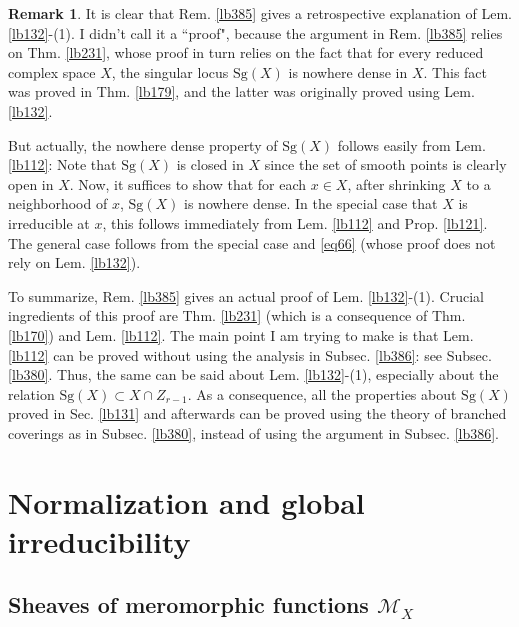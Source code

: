 \documentclass[12pt,b5paper,notitlepage]{report}
\theoremstyle{definition}
\newtheorem{rem}[df]{Remark}
\theoremstyle{plain}
\newcommand{\scr}{\mathscr}
\newcommand{\Sg}{\mathrm{Sg}}
\numberwithin{equation}{section}
\begin{document}
\begin{rem}
It is clear that Rem. \ref{lb385} gives a retrospective explanation of Lem. \ref{lb132}-(1). I didn't call it a ``proof", because the argument in Rem. \ref{lb385} relies on Thm. \ref{lb231}, whose proof in turn relies on the fact that for every reduced complex space $X$, the singular locus $\Sg(X)$ is nowhere dense in $X$. This fact was proved in Thm. \ref{lb179}, and the latter was originally proved using Lem. \ref{lb132}.

But actually, the nowhere dense property of $\Sg(X)$ follows easily from Lem. \ref{lb112}: Note that $\Sg(X)$ is closed in $X$ since the set of smooth points is clearly open in $X$. Now, it suffices to show that for each $x\in X$, after shrinking $X$ to a neighborhood of $x$, $\Sg(X)$ is nowhere dense. In the special case that $X$ is irreducible at $x$, this follows immediately from Lem. \ref{lb112} and  Prop. \ref{lb121}. The general case follows from the special case and \eqref{eq66} (whose proof does not rely on Lem. \ref{lb132}).

To summarize, Rem. \ref{lb385} gives an actual proof of Lem. \ref{lb132}-(1). Crucial ingredients of this proof are Thm. \ref{lb231} (which is a consequence of Thm. \ref{lb170}) and Lem. \ref{lb112}. The main point I am trying to make is that Lem. \ref{lb112} can be proved without using the analysis in Subsec. \ref{lb386}: see Subsec. \ref{lb380}. Thus, the same can be said about Lem. \ref{lb132}-(1), especially about the relation $\Sg(X)\subset X\cap Z_{r-1}$. As a consequence, all the properties about $\Sg(X)$ proved in Sec. \ref{lb131} and afterwards can be proved using the theory of branched coverings as in Subsec. \ref{lb380}, instead of using the argument in Subsec. \ref{lb386}.  \hfill\qedsymbol
\end{rem}








\chapter{Normalization and global irreducibility}



\section{Sheaves of meromorphic functions $\scr M_X$}
\end{document}
